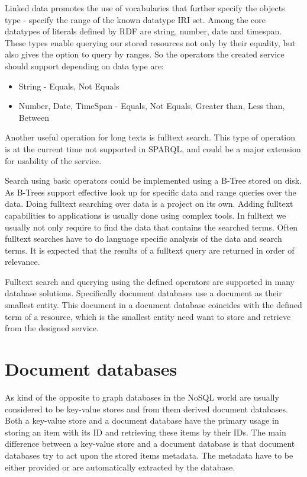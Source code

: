 Linked data promotes the use of vocabularies %
that further specify the objects type - specify the range of the known datatype IRI set.
Among the core datatypes of literals defined by RDF are string, number, date and timespan. These types enable querying our stored resources not only by their equality, but also gives the option to query by ranges. So the operators the created service should support depending on data type are:
\begin{itemize}
	\item String - Equals, Not Equals
	\item Number, Date, TimeSpan - Equals, Not Equals, Greater than, Less than, Between
\end{itemize}
Another useful operation for long texts is fulltext search. %
This type of operation is at the current time not supported in SPARQL, and could be a major extension for usability of the service.

Search using basic operators could be implemented using a B-Tree stored on disk. As B-Trees support effective look up for specific data and range queries over the data.
Doing fulltext searching over data is a project on its own. Adding fulltext capabilities to applications is usually done using complex tools. In fulltext we usually not only require to find the data that contains the searched terms. Often fulltext searches have to do language specific analysis of the data and search terms. It is expected that the results of a fulltext query are returned in order of relevance.

Fulltext search and querying using the defined operators are supported in many database solutions. Specifically document databases use a document as their smallest entity. This document in a document database coincides with the defined term of a resource, which is the smallest entity need want to store and retrieve from the designed service. 

\section{Document databases}
As kind of the opposite to graph databases in the NoSQL world are usually considered to be key-value stores and from them derived document databases. Both a key-value store and a document database have the primary usage in storing an item with its ID and retrieving these items by their IDs. The main difference between a key-value store and a document database is that document databases try to act upon the stored items metadata. The metadata have to be either provided or are automatically extracted by the database. 

